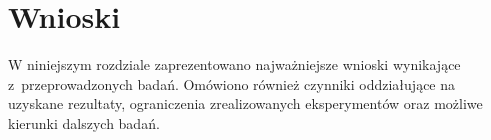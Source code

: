 \cleardoublepage
\chapter{Wnioski}
\label{cha:Wnioski}

W niniejszym rozdziale zaprezentowano najważniejsze wnioski wynikające z~przeprowadzonych badań. 
Omówiono również czynniki oddziałujące na uzyskane rezultaty, ograniczenia zrealizowanych eksperymentów 
oraz możliwe kierunki dalszych badań.







